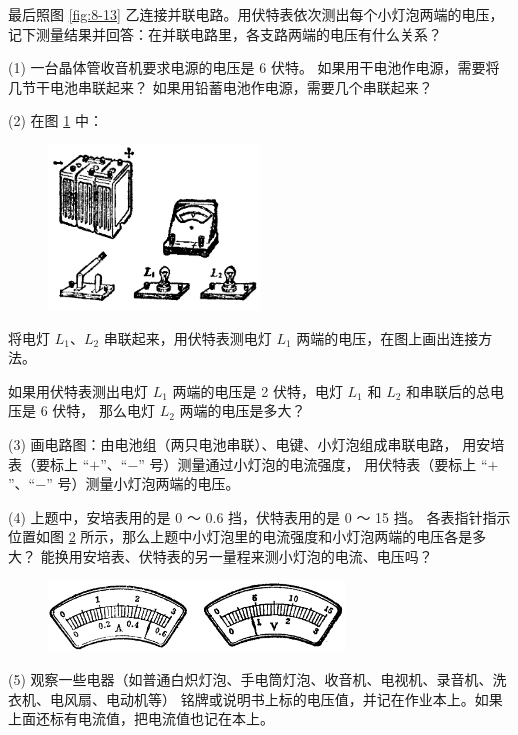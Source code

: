 最后照图 \ref{fig:8-13} 乙连接并联电路。用伏特表依次测出每个小灯泡两端的电压，
记下测量结果并回答：在并联电路里，各支路两端的电压有什么关系？



\lianxi

(1) 一台晶体管收音机要求电源的电压是 6 伏特。
如果用干电池作电源，需要将几节干电池串联起来？
如果用铅蓄电池作电源，需要几个串联起来？

(2)  在图 \ref{fig:8-14} 中：

\begin{figure}[htbp]
    \centering
    \includegraphics[width=0.5\textwidth]{../pic/czwl2-ch8-14}
    \caption{}\label{fig:8-14}
\end{figure}

 将电灯 $L_1$、$L_2$ 串联起来，用伏特表测电灯 $L_1$ 两端的电压，在图上画出连接方法。

 如果用伏特表测出电灯 $L_1$ 两端的电压是 2 伏特，电灯 $L_1$ 和 $L_2$ 和串联后的总电压是 6 伏特，
那么电灯 $L_2$ 两端的电压是多大？

(3)  画电路图：由电池组（两只电池串联）、电键、小灯泡组成串联电路，
用安培表（要标上 “$+$”、“$-$” 号）测量通过小灯泡的电流强度，
用伏特表（要标上 “$+$”、“$-$” 号）测量小灯泡两端的电压。

(4) 上题中，安培表用的是 0 ～ 0.6 挡，伏特表用的是 0 ～ 15 挡。
各表指针指示位置如图 \ref{fig:8-15} 所示，那么上题中小灯泡里的电流强度和小灯泡两端的电压各是多大？
能换用安培表、伏特表的另一量程来测小灯泡的电流、电压吗？

\begin{figure}[htbp]
    \centering
    \includegraphics[width=0.7\textwidth]{../pic/czwl2-ch8-15}
    \caption{}\label{fig:8-15}
\end{figure}

(5)  观察一些电器（如普通白炽灯泡、手电筒灯泡、收音机、电视机、录音机、洗衣机、电风扇、电动机等）
铭牌或说明书上标的电压值，并记在作业本上。如果上面还标有电流值，把电流值也记在本上。

